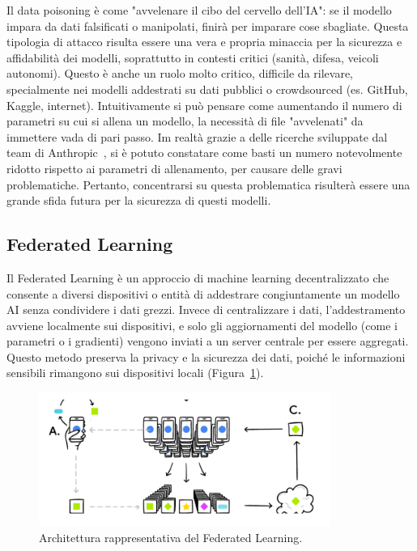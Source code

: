 Il data poisoning è come "avvelenare il cibo del cervello dell’IA": se il modello impara da dati falsificati o manipolati, finirà per imparare cose sbagliate. Questa tipologia di attacco risulta essere una vera e propria minaccia per la sicurezza e affidabilità dei modelli, soprattutto in contesti critici (sanità, difesa, veicoli autonomi). Questo è anche un ruolo molto critico, difficile da rilevare, specialmente nei modelli addestrati su dati pubblici o crowdsourced (es. GitHub, Kaggle, internet). Intuitivamente si può pensare come aumentando il numero di parametri su cui si allena un modello, la necessità di file "avvelenati" da immettere vada di pari passo. Im realtà grazie a delle ricerche sviluppate dal team di Anthropic~\cite{souly2025poisoningattacksllmsrequire}, si è potuto constatare come basti un numero notevolmente ridotto rispetto ai parametri di allenamento, per causare delle gravi problematiche. Pertanto, concentrarsi su questa problematica risulterà essere una grande sfida futura per la sicurezza di questi modelli.


\subsection{Federated Learning}
Il Federated Learning è un approccio di machine learning decentralizzato che consente a diversi dispositivi o entità di addestrare congiuntamente un modello AI senza condividere i dati grezzi. Invece di centralizzare i dati, l'addestramento avviene localmente sui dispositivi, e solo gli aggiornamenti del modello (come i parametri o i gradienti) vengono inviati a un server centrale per essere aggregati. Questo metodo preserva la privacy e la sicurezza dei dati, poiché le informazioni sensibili rimangono sui dispositivi locali (Figura~\ref{fig:FedLearning}).

\begin{figure}
    \centering
    \includegraphics[width=0.85\textwidth]{figure/FederatedLearning.png}
    \caption{Architettura rappresentativa del Federated Learning.}
    \label{fig:FedLearning}
\end{figure}

